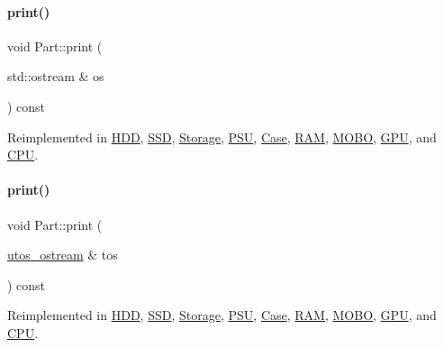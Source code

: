 \mbox{\label{class_part_a4fa402b8e8fd4236ff773a7697ab2bc3}} 
\paragraph{\texorpdfstring{print()}{print()}\hspace{0.1cm}{\footnotesize\ttfamily [1/2]}}
{\footnotesize\ttfamily void Part\+::print (\begin{DoxyParamCaption}\item[{std\+::ostream \&}]{os }\end{DoxyParamCaption}) const\hspace{0.3cm}{\ttfamily [virtual]}}



Reimplemented in \mbox{\hyperlink{class_h_d_d_a07c34356018542934a4dd91ce38b0821}{H\+DD}}, \mbox{\hyperlink{class_s_s_d_a3c07aa0fd7bb547cfb4a775513e427a9}{S\+SD}}, \mbox{\hyperlink{class_storage_aa9f6ffb0fd45839b54bd4e254270445d}{Storage}}, \mbox{\hyperlink{class_p_s_u_ad8f95676e09f5ba805dbba50759f44ba}{P\+SU}}, \mbox{\hyperlink{class_case_a9e54f42dcb7b62f1792a6475ce60aa79}{Case}}, \mbox{\hyperlink{class_r_a_m_a2f226659cbc23f841d73525572ba9574}{R\+AM}}, \mbox{\hyperlink{class_m_o_b_o_a3241f425030e01d5b7a192c23af2dbda}{M\+O\+BO}}, \mbox{\hyperlink{class_g_p_u_abfa2a8fa30047e9759080d724e4b3820}{G\+PU}}, and \mbox{\hyperlink{class_c_p_u_ad4d3ebb288deeaad640e034bdb71a40a}{C\+PU}}.

\mbox{\label{class_part_a9ecabe44ba3415badf82c6a23617a41e}} 
\paragraph{\texorpdfstring{print()}{print()}\hspace{0.1cm}{\footnotesize\ttfamily [2/2]}}
{\footnotesize\ttfamily void Part\+::print (\begin{DoxyParamCaption}\item[{\mbox{\hyperlink{structutos__ostream}{utos\+\_\+ostream}} \&}]{tos }\end{DoxyParamCaption}) const\hspace{0.3cm}{\ttfamily [virtual]}}



Reimplemented in \mbox{\hyperlink{class_h_d_d_aca2c2583fa3304917905cd9185b64539}{H\+DD}}, \mbox{\hyperlink{class_s_s_d_ab07086e302f8be99cfa757583d2017a0}{S\+SD}}, \mbox{\hyperlink{class_storage_ab7ecf9e0777891b4e1a84bbf391a1cd4}{Storage}}, \mbox{\hyperlink{class_p_s_u_a81c74aa3a327003c58b89ca2b8602c1d}{P\+SU}}, \mbox{\hyperlink{class_case_ae179519844b825815f4accddafae13b6}{Case}}, \mbox{\hyperlink{class_r_a_m_a11a874dd6cf99454efd6b7a1d20a3737}{R\+AM}}, \mbox{\hyperlink{class_m_o_b_o_a4c78cec3a2a3e4d4480855622f50bd06}{M\+O\+BO}}, \mbox{\hyperlink{class_g_p_u_acfa9ab35cdf1c25c324fc39c6ffc2412}{G\+PU}}, and \mbox{\hyperlink{class_c_p_u_a0aea700bac0896b9e4434770737078d0}{C\+PU}}.



